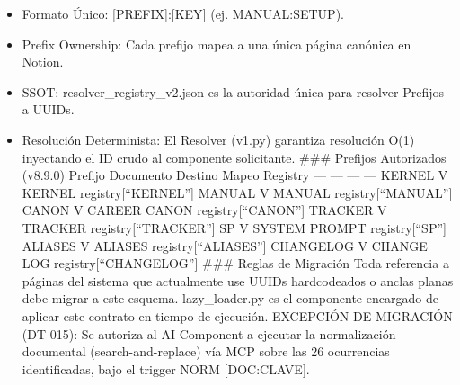 \documentclass[
]{article}
\providecommand{\tightlist}{%
  \setlength{\itemsep}{0pt}\setlength{\parskip}{0pt}}
\begin{document}
\begin{itemize}
\tightlist
\item
  Formato Único: {[}PREFIX{]}:{[}KEY{]} (ej. MANUAL:SETUP).
\item
  Prefix Ownership: Cada prefijo mapea a una única página canónica en
  Notion.
\item
  SSOT: resolver\_registry\_v2.json es la autoridad única para resolver
  Prefijos a UUIDs.
\item
  Resolución Determinista: El Resolver (v1.py) garantiza resolución O(1)
  inyectando el ID crudo al componente solicitante. \#\#\# Prefijos
  Autorizados (v8.9.0) \textbar{} Prefijo \textbar{} Documento Destino
  \textbar{} Mapeo Registry \textbar{} \textbar{} \textbar{} ---
  \textbar{} --- \textbar{} --- \textbar{} --- \textbar{} \textbar{}
  KERNEL \textbar{} V \textbar{} KERNEL \textbar{}
  registry{[}``KERNEL''{]} \textbar{} \textbar{} MANUAL \textbar{} V
  \textbar{} MANUAL \textbar{} registry{[}``MANUAL''{]} \textbar{}
  \textbar{} CANON \textbar{} V \textbar{} CAREER CANON \textbar{}
  registry{[}``CANON''{]} \textbar{} \textbar{} TRACKER \textbar{} V
  \textbar{} TRACKER \textbar{} registry{[}``TRACKER''{]} \textbar{}
  \textbar{} SP \textbar{} V \textbar{} SYSTEM PROMPT \textbar{}
  registry{[}``SP''{]} \textbar{} \textbar{} ALIASES \textbar{} V
  \textbar{} ALIASES \textbar{} registry{[}``ALIASES''{]} \textbar{}
  \textbar{} CHANGELOG \textbar{} V \textbar{} CHANGE LOG \textbar{}
  registry{[}``CHANGELOG''{]} \textbar{} \#\#\# Reglas de Migración Toda
  referencia a páginas del sistema que actualmente use UUIDs
  hardcodeados o anclas planas debe migrar a este esquema.
  lazy\_loader.py es el componente encargado de aplicar este contrato en
  tiempo de ejecución. EXCEPCIÓN DE MIGRACIÓN (DT-015): Se autoriza al
  AI Component a ejecutar la normalización documental
  (search-and-replace) vía MCP sobre las 26 ocurrencias identificadas,
  bajo el trigger NORM {[}DOC:CLAVE{]}.
\end{itemize}
\end{document}
